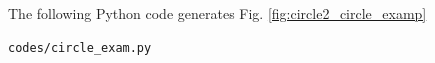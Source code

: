\begin{enumerate}[label=\thesubsection.\arabic*.,ref=\thesubsection.\theenumi]
The following Python code generates Fig. \ref{fig:circle2_circle_examp}

\begin{lstlisting}
codes/circle_exam.py
\end{lstlisting}

\end{enumerate}